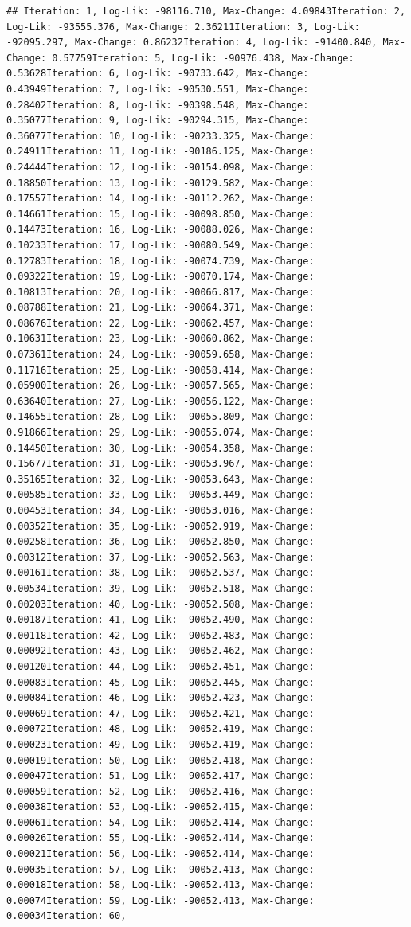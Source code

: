 \documentclass[
  english,
  man,floatsintext]{apa6}
\begin{document}
\begin{verbatim}
## Iteration: 1, Log-Lik: -98116.710, Max-Change: 4.09843Iteration: 2, Log-Lik: -93555.376, Max-Change: 2.36211Iteration: 3, Log-Lik: -92095.297, Max-Change: 0.86232Iteration: 4, Log-Lik: -91400.840, Max-Change: 0.57759Iteration: 5, Log-Lik: -90976.438, Max-Change: 0.53628Iteration: 6, Log-Lik: -90733.642, Max-Change: 0.43949Iteration: 7, Log-Lik: -90530.551, Max-Change: 0.28402Iteration: 8, Log-Lik: -90398.548, Max-Change: 0.35077Iteration: 9, Log-Lik: -90294.315, Max-Change: 0.36077Iteration: 10, Log-Lik: -90233.325, Max-Change: 0.24911Iteration: 11, Log-Lik: -90186.125, Max-Change: 0.24444Iteration: 12, Log-Lik: -90154.098, Max-Change: 0.18850Iteration: 13, Log-Lik: -90129.582, Max-Change: 0.17557Iteration: 14, Log-Lik: -90112.262, Max-Change: 0.14661Iteration: 15, Log-Lik: -90098.850, Max-Change: 0.14473Iteration: 16, Log-Lik: -90088.026, Max-Change: 0.10233Iteration: 17, Log-Lik: -90080.549, Max-Change: 0.12783Iteration: 18, Log-Lik: -90074.739, Max-Change: 0.09322Iteration: 19, Log-Lik: -90070.174, Max-Change: 0.10813Iteration: 20, Log-Lik: -90066.817, Max-Change: 0.08788Iteration: 21, Log-Lik: -90064.371, Max-Change: 0.08676Iteration: 22, Log-Lik: -90062.457, Max-Change: 0.10631Iteration: 23, Log-Lik: -90060.862, Max-Change: 0.07361Iteration: 24, Log-Lik: -90059.658, Max-Change: 0.11716Iteration: 25, Log-Lik: -90058.414, Max-Change: 0.05900Iteration: 26, Log-Lik: -90057.565, Max-Change: 0.63640Iteration: 27, Log-Lik: -90056.122, Max-Change: 0.14655Iteration: 28, Log-Lik: -90055.809, Max-Change: 0.91866Iteration: 29, Log-Lik: -90055.074, Max-Change: 0.14450Iteration: 30, Log-Lik: -90054.358, Max-Change: 0.15677Iteration: 31, Log-Lik: -90053.967, Max-Change: 0.35165Iteration: 32, Log-Lik: -90053.643, Max-Change: 0.00585Iteration: 33, Log-Lik: -90053.449, Max-Change: 0.00453Iteration: 34, Log-Lik: -90053.016, Max-Change: 0.00352Iteration: 35, Log-Lik: -90052.919, Max-Change: 0.00258Iteration: 36, Log-Lik: -90052.850, Max-Change: 0.00312Iteration: 37, Log-Lik: -90052.563, Max-Change: 0.00161Iteration: 38, Log-Lik: -90052.537, Max-Change: 0.00534Iteration: 39, Log-Lik: -90052.518, Max-Change: 0.00203Iteration: 40, Log-Lik: -90052.508, Max-Change: 0.00187Iteration: 41, Log-Lik: -90052.490, Max-Change: 0.00118Iteration: 42, Log-Lik: -90052.483, Max-Change: 0.00092Iteration: 43, Log-Lik: -90052.462, Max-Change: 0.00120Iteration: 44, Log-Lik: -90052.451, Max-Change: 0.00083Iteration: 45, Log-Lik: -90052.445, Max-Change: 0.00084Iteration: 46, Log-Lik: -90052.423, Max-Change: 0.00069Iteration: 47, Log-Lik: -90052.421, Max-Change: 0.00072Iteration: 48, Log-Lik: -90052.419, Max-Change: 0.00023Iteration: 49, Log-Lik: -90052.419, Max-Change: 0.00019Iteration: 50, Log-Lik: -90052.418, Max-Change: 0.00047Iteration: 51, Log-Lik: -90052.417, Max-Change: 0.00059Iteration: 52, Log-Lik: -90052.416, Max-Change: 0.00038Iteration: 53, Log-Lik: -90052.415, Max-Change: 0.00061Iteration: 54, Log-Lik: -90052.414, Max-Change: 0.00026Iteration: 55, Log-Lik: -90052.414, Max-Change: 0.00021Iteration: 56, Log-Lik: -90052.414, Max-Change: 0.00035Iteration: 57, Log-Lik: -90052.413, Max-Change: 0.00018Iteration: 58, Log-Lik: -90052.413, Max-Change: 0.00074Iteration: 59, Log-Lik: -90052.413, Max-Change: 0.00034Iteration: 60, 
\end{verbatim}
\end{document}
